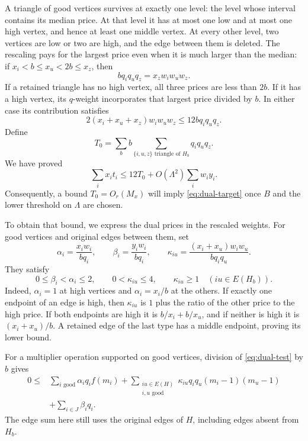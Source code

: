 A triangle of good vertices survives at exactly one level: the level
whose interval contains its median price.  At that level it has at most
one low and at most one high vertex, and hence at least one middle
vertex.  At every other level, two vertices are low or two are high,
and the edge between them is deleted.  The rescaling pays for the
largest price even when it is much larger than the median: if
$x_i<b\le x_u<2b\le x_z$, then
\[
 bq_iq_uq_z=x_z w_iw_uw_z.
\]
If a retained triangle has no high vertex, all three prices are less than $2b$.
If it has a high vertex, its $q$-weight incorporates that largest price
divided by $b$.  In either case its contribution satisfies
\[
 2(x_i+x_u+x_z)w_iw_uw_z\le12bq_iq_uq_z.
\]
Define
\begin{equation}
\label{eq:dyadic-triangle-mass}
 T_0=\sum_b b
       \sum_{\{i,u,z\}\text{ triangle of }H_b}q_iq_uq_z.
\end{equation}
We have proved
\begin{equation}
\label{eq:triangle-reduction}
 \sum_i x_i t_i\le12T_0+O(\Lambda^2)\sum_i w_i y_i.
\end{equation}
Consequently, a bound $T_0=O_r(M_x)$ will imply
\eqref{eq:dual-target} once $B$ and the lower threshold on $\Lambda$
are chosen.

To obtain that bound, we express the dual prices in the rescaled
weights.  For good vertices and original edges between them, set
\begin{equation}
\label{eq:rescaled-coefficients}
 \alpha_i=\frac{x_iw_i}{bq_i},\qquad
 \beta_i=\frac{y_iw_i}{bq_i},\qquad
 \kappa_{iu}=\frac{(x_i+x_u)w_iw_u}{bq_iq_u}.
\end{equation}
They satisfy
\begin{equation}
\label{eq:coefficient-bounds}
 0\le\beta_i<\alpha_i\le2,\qquad
 0<\kappa_{iu}\le4,\qquad
 \kappa_{iu}\ge1\quad(iu\in E(H_b)).
\end{equation}
Indeed, $\alpha_i=1$ at high vertices and $\alpha_i=x_i/b$ at the
others.  If exactly one endpoint of an edge is high, then
$\kappa_{iu}$ is $1$ plus the ratio of the other price to the high
price.  If both endpoints are high it is $b/x_i+b/x_u$, and if neither
is high it is $(x_i+x_u)/b$.  A retained edge of the last type has a
middle endpoint, proving its lower bound.

For a multiplier operation supported on good vertices, division of
\eqref{eq:dual-test} by $b$ gives
\begin{equation}
\label{eq:normalized-dual}
 \begin{split}
 0\le{}&\sum_{i\text{ good}}\alpha_i q_i f(m_i)
   +\sum_{\substack{iu\in E(H)\\i,u\text{ good}}}
        \kappa_{iu}q_iq_u(m_i-1)(m_u-1)\\
   &+\sum_{i\in J}\beta_iq_i.
 \end{split}
\end{equation}
The edge sum here still uses the original edges of $H$, including
edges absent from $H_b$.

